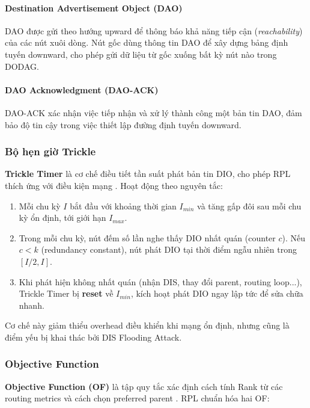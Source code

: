 \paragraph{Destination Advertisement Object (DAO)}
DAO được gửi theo hướng upward để thông báo khả năng tiếp cận
(\textit{reachability}) của các nút xuôi dòng. Nút gốc dùng thông tin
DAO để xây dựng bảng định tuyến downward, cho phép gửi dữ liệu từ gốc
xuống bất kỳ nút nào trong DODAG.

\paragraph{DAO Acknowledgment (DAO-ACK)}
DAO-ACK xác nhận việc tiếp nhận và xử lý thành công một bản tin DAO,
đảm bảo độ tin cậy trong việc thiết lập đường định tuyến downward.

\subsubsection{Bộ hẹn giờ Trickle}

\textbf{Trickle Timer} là cơ chế điều tiết tần suất phát bản tin DIO,
cho phép RPL thích ứng với điều kiện mạng \cite{prajisha2025dis}. Hoạt
động theo nguyên tắc:

\begin{enumerate}
    \item Mỗi chu kỳ $I$ bắt đầu với khoảng thời gian $I_{min}$ và tăng
          gấp đôi sau mỗi chu kỳ ổn định, tới giới hạn $I_{max}$.
    \item Trong mỗi chu kỳ, nút đếm số lần nghe thấy DIO nhất quán
          (counter $c$). Nếu $c < k$ (redundancy constant), nút phát
          DIO tại thời điểm ngẫu nhiên trong $[I/2, I]$.
    \item Khi phát hiện không nhất quán (nhận DIS, thay đổi parent,
          routing loop...), Trickle Timer bị \textbf{reset} về $I_{min}$,
          kích hoạt phát DIO ngay lập tức để sửa chữa nhanh.
\end{enumerate}

Cơ chế này giảm thiểu overhead điều khiển khi mạng ổn định, nhưng cũng
là điểm yếu bị khai thác bởi DIS Flooding Attack.

\subsubsection{Objective Function}

\textbf{Objective Function (OF)} là tập quy tắc xác định cách tính Rank
từ các routing metrics và cách chọn preferred parent \cite{decrank2022}.
RPL chuẩn hóa hai OF:

